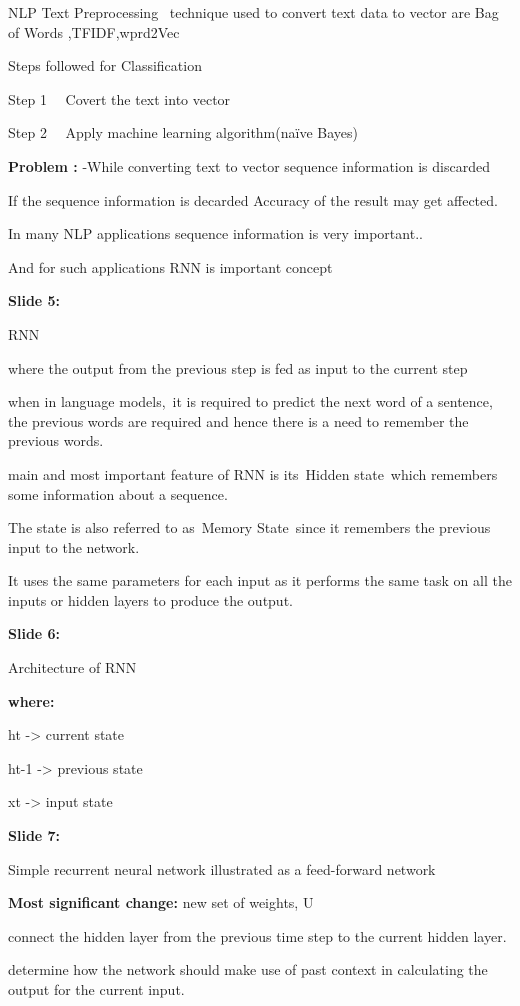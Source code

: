 \documentclass[11pt,a4paper]{article}
\begin{document}
NLP Text Preprocessing  technique used to convert text data to vector are Bag of Words ,TFIDF,wprd2Vec

Steps followed for Classification

Step 1   Covert the text into vector

Step 2   Apply machine learning algorithm(naïve Bayes)

\textbf{Problem :} -While converting text to vector sequence information is discarded

If the sequence information is decarded Accuracy of the result may get affected.

In many NLP applications sequence information is very important..

And for such applications RNN is important concept

\textbf{Slide 5:}

RNN

where the output from the previous step is fed as input to the current step

when in language models, it is required to predict the next word of a sentence, the previous words are required and hence there is a need to remember the previous words.

main and most important feature of RNN is its Hidden state which remembers some information about a sequence.

The state is also referred to as Memory State since it remembers the previous input to the network.

It uses the same parameters for each input as it performs the same task on all the inputs or hidden layers to produce the output.

\textbf{Slide 6:}

Architecture of RNN

\textbf{where:} 

ht -> current state

ht-1 -> previous state

xt -> input state

\textbf{Slide 7:}

Simple recurrent neural network illustrated as a feed-forward network

\textbf{Most significant change:}  new set of weights, U

connect the hidden layer from the previous time step to the current hidden layer.

determine how the network should make use of past context in calculating the output for the current input.
\end{document}
